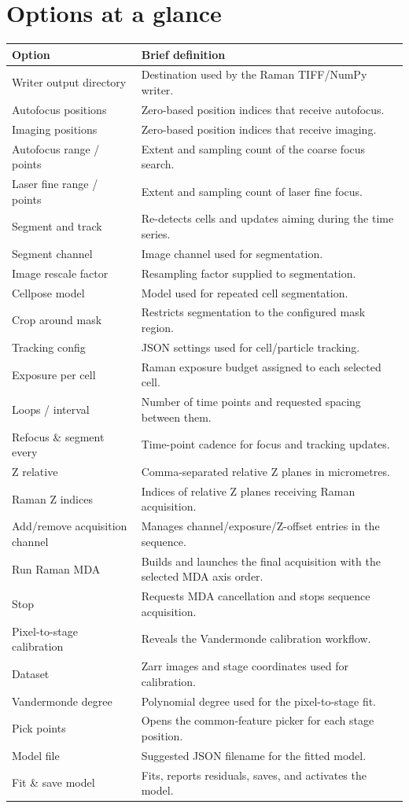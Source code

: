\documentclass[11pt,oneside]{report}
\begin{document}
\section*{Options at a glance}
\begin{longtable}{@{}p{}p{}@{}}
\toprule\textbf{Option} & \textbf{Brief definition}\\\midrule
Writer output directory & Destination used by the Raman TIFF/NumPy writer.\\
Autofocus positions & Zero-based position indices that receive autofocus.\\
Imaging positions & Zero-based position indices that receive imaging.\\
Autofocus range / points & Extent and sampling count of the coarse focus search.\\
Laser fine range / points & Extent and sampling count of laser fine focus.\\
Segment and track & Re-detects cells and updates aiming during the time series.\\
Segment channel & Image channel used for segmentation.\\
Image rescale factor & Resampling factor supplied to segmentation.\\
Cellpose model & Model used for repeated cell segmentation.\\
Crop around mask & Restricts segmentation to the configured mask region.\\
Tracking config & JSON settings used for cell/particle tracking.\\
Exposure per cell & Raman exposure budget assigned to each selected cell.\\
Loops / interval & Number of time points and requested spacing between them.\\
Refocus \& segment every & Time-point cadence for focus and tracking updates.\\
Z relative & Comma-separated relative Z planes in micrometres.\\
Raman Z indices & Indices of relative Z planes receiving Raman acquisition.\\
Add/remove acquisition channel & Manages channel/exposure/Z-offset entries in
the sequence.\\
Run Raman MDA & Builds and launches the final acquisition with the selected MDA axis order.\\
Stop & Requests MDA cancellation and stops sequence acquisition.\\
Pixel-to-stage calibration & Reveals the Vandermonde calibration workflow.\\
Dataset & Zarr images and stage coordinates used for calibration.\\
Vandermonde degree & Polynomial degree used for the pixel-to-stage fit.\\
Pick points & Opens the common-feature picker for each stage position.\\
Model file & Suggested JSON filename for the fitted model.\\
Fit \& save model & Fits, reports residuals, saves, and activates the model.\\
\bottomrule\end{longtable}
\end{document}
